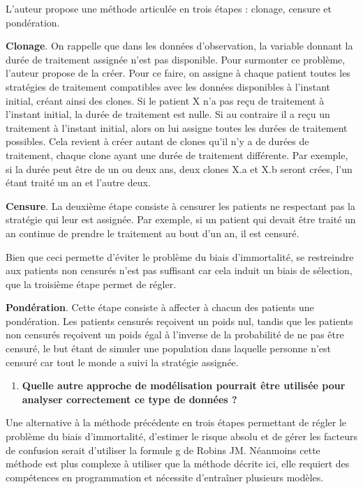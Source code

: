 \documentclass[12pt, a4paper]{article}
\begin{document}
    L'auteur propose une méthode articulée en trois étapes : clonage, censure et pondération.
    
    \textbf{Clonage}. On rappelle que dans les données d'observation, la variable donnant la durée de traitement assignée n'est pas disponible. Pour surmonter ce problème, l'auteur propose de la créer. Pour ce faire, on assigne à chaque patient toutes les stratégies de traitement compatibles avec les données disponibles à l'instant initial, créant ainsi des clones. Si le patient X n'a pas reçu de traitement à l'instant initial, la durée de traitement est nulle. Si au contraire il a reçu un traitement à l'instant initial, alors on lui assigne toutes les durées de traitement possibles. Cela revient à créer autant de clones qu'il n'y a de durées de traitement, chaque clone ayant une durée de traitement différente. Par exemple, si la durée peut être de un ou deux ans, deux clones X.a et X.b seront crées, l'un étant traité un an et l'autre deux.
    
    \textbf{Censure}. La deuxième étape consiste à censurer les patients ne respectant pas la stratégie qui leur est assignée. Par exemple, si un patient qui devait être traité un an continue de prendre le traitement au bout d'un an, il est censuré.
    
    Bien que ceci permette d'éviter le problème du  biais d'immortalité, se restreindre aux patients non censurés n'est pas suffisant car cela induit un biais de sélection, que la troisième étape permet de régler.
    
    \textbf{Pondération}. Cette étape consiste à affecter à chacun des patients une pondération. Les patients censurés reçoivent un poids nul, tandis que les patients non censurés reçoivent un poids égal à l'inverse de la probabilité de ne pas être censuré, le but étant de simuler une population dans laquelle personne n'est censuré car tout le monde a suivi la stratégie assignée.


\begin{enumerate}[resume]    
    \item \textbf{Quelle autre approche de modélisation pourrait être utilisée pour analyser correctement ce type de données ?}
\end{enumerate}

    Une alternative à la méthode précédente en trois étapes permettant de régler le problème du biais d'immortalité, d'estimer le risque absolu et de gérer les facteurs de confusion serait d'utiliser la formule g de Robins JM. Néanmoins cette méthode est plus complexe à utiliser que la méthode décrite ici, elle requiert des compétences en programmation et nécessite d'entraîner plusieurs modèles.
\end{document}
